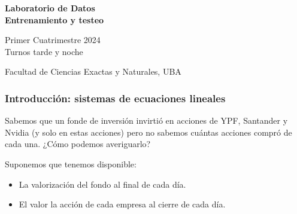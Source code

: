 \documentclass[aspectratio=169,12pt]{beamer}
\begin{document}

\begin{frame}

 \begin{center}

\Large\textbf{Laboratorio de Datos} \\
\large\textbf{Entrenamiento y testeo}




\vspace{1cm}
Primer Cuatrimestre 2024 \\ Turnos tarde y noche

\vspace{1cm}


 {\small Facultad de Ciencias Exactas y Naturales, UBA}
 \end{center}


\end{frame}


\begin{frame}
\frametitle{Introducción: sistemas de ecuaciones lineales}

Sabemos que un fonde de inversión invirtió en acciones de YPF, Santander y Nvidia (y solo en estas acciones) pero no sabemos cuántas acciones compró de cada una. ¿Cómo podemos averiguarlo? 

\pause

Suponemos que tenemos disponible:
\begin{itemize}
\item La valorización del fondo al final de cada día.
\item El valor la acción de cada empresa al cierre de cada día. 
\end{itemize}

\end{frame}

\end{document}

